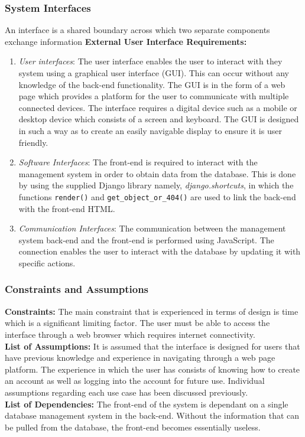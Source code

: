 \documentclass[10pt,twocolumn]{witseiepaper}
\begin{document}
	\subsubsection{System Interfaces}
	An interface is a shared boundary across which two separate components exchange information
	\newline
	\textbf{External User Interface Requirements: }
	\begin{enumerate}
		\item \textit{User interfaces}: The user interface enables the user to interact with they system using a graphical user interface (GUI). This can occur without any knowledge of the back-end functionality. The GUI is in the form of a web page which provides a platform for the user to communicate with multiple connected devices. The interface requires a digital device such as a mobile or desktop device which consists of a screen and keyboard. The GUI is designed in such a way as to create an easily navigable display to ensure it is user friendly.
		\item \textit{Software Interfaces}: The front-end is required to interact with the management system in order to obtain data from the database. This is done by using the supplied Django library namely, \textit{django.shortcuts}, in which the functions \texttt{render()} and \texttt{get\_object\_or\_404()} are used to link the back-end with the front-end HTML. 
		\item \textit{Communication Interfaces}: The communication between the management system back-end and the front-end is performed using JavaScript. The connection enables the user to interact with the database by updating it with specific actions.
	\end{enumerate}
	
	\subsubsection{Constraints and Assumptions}
	\textbf{Constraints: }The main constraint that is experienced in terms of design is time which is a significant limiting factor. The user must be able to access the interface through a web browser which requires internet connectivity.
	\\
	\textbf{List of Assumptions: }It is assumed that the interface is designed for users that have previous knowledge and experience in navigating through a web page platform. The experience in which the user has consists of knowing how to create an account as well as logging into the account for future use. Individual assumptions regarding each use case has been discussed previously. \\
	\textbf{List of Dependencies: }The front-end of the system is dependant on a single database management system in the back-end. Without the information that can be pulled from the database, the front-end becomes essentially useless.
	
\end{document}
